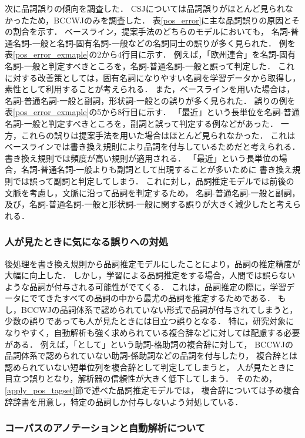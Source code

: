 \documentclass[japanese]{jnlp_1.4}
\begin{document}
次に品詞誤りの傾向を調査した．
CSJについては品詞誤りがほとんど見られなかったため，BCCWJのみを調査した．
表\ref{pos_error}に主な品詞誤りの原因とその割合を示す．
ベースライン，提案手法のどちらのモデルにおいても，
名詞-普通名詞-一般と名詞-固有名詞-一般などの名詞同士の誤りが多く見られた．
例を表\ref{pos_error_exmaple}の2から4行目に示す．
例えば，「欧州連合」を名詞-固有名詞-一般と判定すべきところを，名詞-普通名詞-一般と誤って判定した．
これに対する改善策としては，固有名詞になりやすい名詞を学習データから取得し，素性として利用することが考えられる．
また，ベースラインを用いた場合は，名詞-普通名詞-一般と副詞，形状詞-一般との誤りが多く見られた．
誤りの例を表\ref{pos_error_exmaple}の5から8行目に示す．
「最近」という長単位を名詞-普通名詞-一般と判定すべきところを，副詞と誤って判定する例などがあった．
一方，これらの誤りは提案手法を用いた場合はほとんど見られなかった．
これはベースラインでは書き換え規則により品詞を付与しているためだと考えられる．
書き換え規則では頻度が高い規則が適用される．
「最近」という長単位の場合，名詞-普通名詞-一般よりも副詞として出現することが多いために
書き換え規則では誤って副詞と判定してしまう．
これに対し，品詞推定モデルでは前後の文脈を考慮し，文脈に沿って品詞を判定するため，
名詞-普通名詞-一般と副詞，及び，名詞-普通名詞-一般と形状詞-一般に関する誤りが大きく減少したと考えられる．


\subsubsection{人が見たときに気になる誤りへの対処}

後処理を書き換え規則から品詞推定モデルにしたことにより，品詞の推定精度が大幅に向上した．
しかし，学習による品詞推定をする場合，人間では誤らないような品詞が付与される可能性がでてくる．
これは，品詞推定の際に，学習データにでてきたすべての品詞の中から最尤の品詞を推定するためである．
もし，BCCWJの品詞体系で認められていない形式で品詞が付与されてしまうと，
少数の誤りであっても人が見たときには目立つ誤りとなる．
特に，研究対象になりやすく，自動解析も強く求められている複合辞などに対しては配慮する必要がある．
例えば，「として」という助詞-格助詞の複合辞に対して，
BCCWJの品詞体系で認められていない助詞-係助詞などの品詞を付与したり，
複合辞とは認められていない短単位列を複合辞として判定してしまうと，
人が見たときに目立つ誤りとなり，解析器の信頼性が大きく低下してしまう．
そのため，\ref{apply_pos_tagset}節で述べた品詞推定モデルでは，
複合辞については予め複合辞辞書を用意し，特定の品詞しか付与しないよう対処している．


\subsubsection{コーパスのアノテーションと自動解析について}
\end{document}
